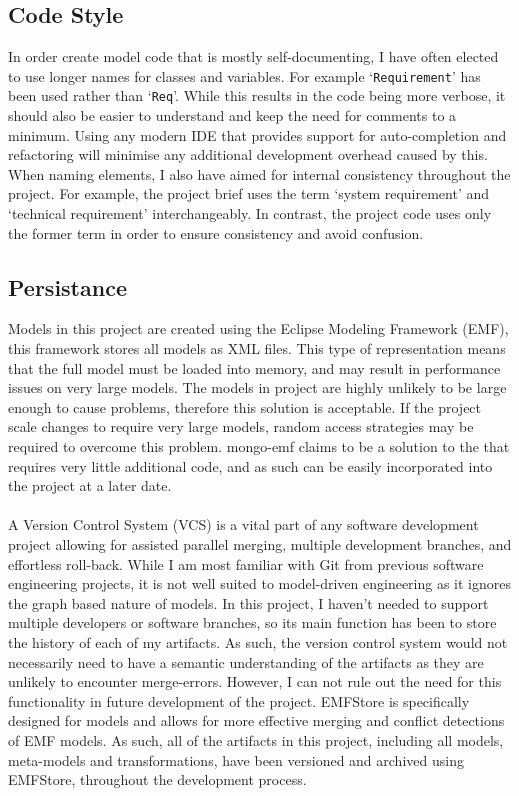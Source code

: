 \documentclass{article}
\begin{document}
\subsection{Code Style}
In order create model code that is mostly self-documenting, I have often elected to use longer names for classes and variables. For example `\texttt{Requirement}' has been used rather than `\texttt{Req}'. While this results in the code being more verbose, it should also be easier to understand and keep the need for comments to a minimum. Using any modern IDE that provides support for auto-completion and refactoring will minimise any additional development overhead caused by this. When naming elements, I also have aimed for internal consistency throughout the project. For example, the project brief uses the term `system requirement' and `technical requirement' interchangeably. In contrast, the project code uses only the former term in order to ensure consistency and avoid confusion.

\subsection{Persistance}
Models in this project are created using the Eclipse Modeling Framework (EMF), this framework stores all models as XML files. This type of representation means that the full model must be loaded into memory, and may result in performance issues on very large models. The models in project are highly unlikely to be large enough to cause problems, therefore this solution is acceptable. If the project scale changes to require very large models, random access strategies may be required to overcome this problem\cite[p.~144]{mdse_in_practice}. mongo-emf claims to be a solution to the that requires very little additional code, and as such can be easily incorporated into the project at a later date\cite{mongo-emf}.
\\\\
A Version Control System (VCS) is a vital part of any software development project allowing for assisted parallel merging, multiple development branches, and effortless roll-back. While I am most familiar with Git from previous software engineering projects, it is not well suited to model-driven engineering as it ignores the graph based nature of models\cite[p.~146]{mdse_in_practice}\cite{evolving_models}. In this project, I haven't needed to support multiple developers or software branches, so its main function has been to store the history of each of my artifacts. As such, the version control system would not necessarily need to have a semantic understanding of the artifacts as they are unlikely to encounter merge-errors. However, I can not rule out the need for this functionality in future development of the project. EMFStore is specifically designed for models and allows for more effective merging and conflict detections of EMF models\cite{emf_store}. As such, all of the artifacts in this project, including all models, meta-models and transformations, have been versioned and archived using EMFStore, throughout the development process.
\end{document}
